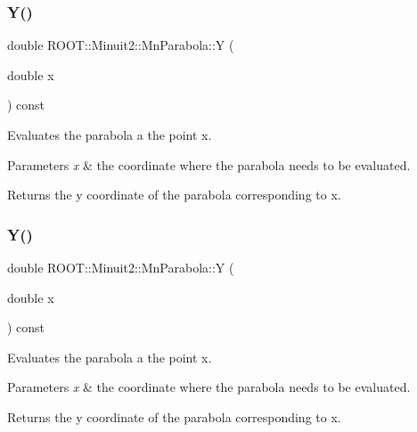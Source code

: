 \subsubsection{\texorpdfstring{Y()}{Y()}\hspace{0.1cm}{\footnotesize\ttfamily [2/3]}}
{\footnotesize\ttfamily double R\+O\+O\+T\+::\+Minuit2\+::\+Mn\+Parabola\+::Y (\begin{DoxyParamCaption}\item[{double}]{x }\end{DoxyParamCaption}) const\hspace{0.3cm}{\ttfamily [inline]}}

Evaluates the parabola a the point x.


\begin{DoxyParams}{Parameters}
{\em x} & the coordinate where the parabola needs to be evaluated.\\
\hline
\end{DoxyParams}
\begin{DoxyReturn}{Returns}
the y coordinate of the parabola corresponding to x. 
\end{DoxyReturn}
\mbox{\label{classROOT_1_1Minuit2_1_1MnParabola_af429c12e92f120e38f75147fd3fc857c}} 
\subsubsection{\texorpdfstring{Y()}{Y()}\hspace{0.1cm}{\footnotesize\ttfamily [3/3]}}
{\footnotesize\ttfamily double R\+O\+O\+T\+::\+Minuit2\+::\+Mn\+Parabola\+::Y (\begin{DoxyParamCaption}\item[{double}]{x }\end{DoxyParamCaption}) const\hspace{0.3cm}{\ttfamily [inline]}}

Evaluates the parabola a the point x.


\begin{DoxyParams}{Parameters}
{\em x} & the coordinate where the parabola needs to be evaluated.\\
\hline
\end{DoxyParams}
\begin{DoxyReturn}{Returns}
the y coordinate of the parabola corresponding to x. 
\end{DoxyReturn}
\mbox{\label{classROOT_1_1Minuit2_1_1MnParabola_a7efab0e0a9902151738605a552adef41}} 
